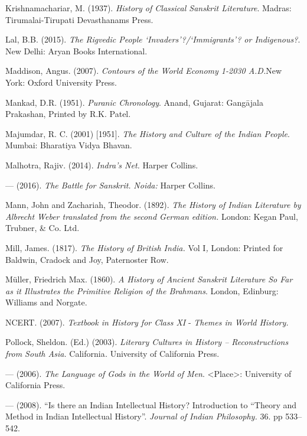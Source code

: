 \begin{thebibliography}{99}
  Krishnamachariar, M. (1937). \textit{History of Classical Sanskrit Literature}. Madras: Tirumalai-Tirupati Devasthanams Press.

  Lal, B.B. (2015). \textit{The Rigvedic People ‘Invaders’?/‘Immigrants’? or Indigenous?}. New Delhi: Aryan Books International.

  Maddison, Angus. (2007). \textit{Contours of the World Economy 1-2030 A.D.}New York: Oxford University Press.

  Mankad, D.R. (1951). \textit{Puranic Chronology}. Anand, Gujarat: Gangājala Prakashan, Printed by R.K. Patel.

  Majumdar, R. C. (2001) [1951]. \textit{The History and Culture of the Indian People}. Mumbai: Bharatiya Vidya Bhavan.

  Malhotra, Rajiv. (2014). \textit{Indra’s Net.} Harper Collins.

  — (2016). \textit{The Battle for Sanskrit.} \textit{Noida:} Harper Collins.

  Mann, John and Zachariah, Theodor. (1892). \textit{The History of Indian Literature by Albrecht Weber translated from the second German edition.} London: Kegan Paul, Trubner, \& Co. Ltd.

  Mill, James. (1817). \textit{The History of British India.} Vol I\textit{,} London: Printed for Baldwin, Cradock and Joy, Paternoster Row.

  Müller, Friedrich Max. (1860). \textit{A History of Ancient Sanskrit Literature So Far as it Illustrates the Primitive Religion of the Brahmans}. London, Edinburg: Williams and Norgate.

  NCERT. (2007). \textit{Textbook in History for Class XI} - \textit{Themes in World History.}

  Pollock, Sheldon. (Ed.) (2003). \textit{Literary Cultures in History – Reconstructions from South Asia.} California\textit{.} University of California Press.

  — (2006). \textit{The Language of Gods in the World of Men}. \textless Place\textgreater : University of California Press.

  — (2008). “Is there an Indian Intellectual History? Introduction to “Theory and Method in Indian Intellectual History”. \textit{Journal of Indian Philosophy.} 36. pp 533–542.


\end{thebibliography}
